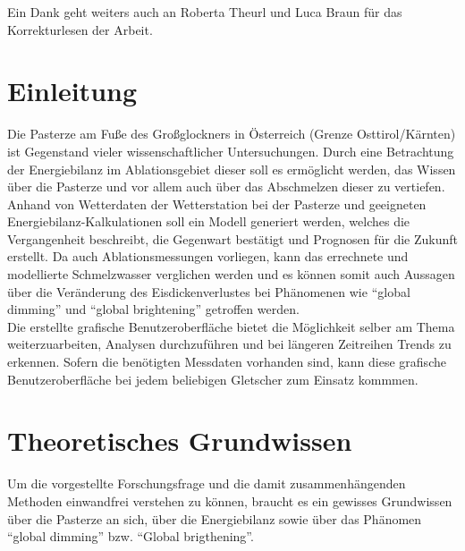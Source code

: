 \documentclass[11pt,a4paper]{article}
\begin{document}
Ein Dank geht weiters auch an Roberta Theurl und Luca Braun für das Korrekturlesen der Arbeit. 


\pagebreak

\tableofcontents
\vspace{1cm}

\pagebreak
\listoffigures
\vspace{1cm}

\pagebreak
\listoftables
\vspace{1cm}


\pagebreak
{}  
\setcounter{page}{1}

\section{Einleitung}
Die Pasterze am Fuße des Großglockners in Österreich (Grenze Osttirol/Kärnten) ist Gegenstand vieler wissenschaftlicher Untersuchungen. Durch eine Betrachtung der Energiebilanz im Ablationsgebiet dieser soll es ermöglicht werden, das Wissen über die Pasterze und vor allem auch über das Abschmelzen dieser zu vertiefen. Anhand von Wetterdaten der Wetterstation bei der Pasterze und geeigneten Energiebilanz-Kalkulationen soll ein Modell generiert werden, welches die Vergangenheit beschreibt, die Gegenwart bestätigt und Prognosen für die Zukunft erstellt. Da auch Ablationsmessungen vorliegen, kann das errechnete und modellierte Schmelzwasser verglichen werden und es können somit auch Aussagen über die Veränderung des Eisdickenverlustes bei Phänomenen wie ``global dimming'' und ``global brightening'' getroffen werden. \\
Die erstellte grafische Benutzeroberfläche bietet die Möglichkeit selber am Thema weiterzuarbeiten, Analysen durchzuführen und bei längeren Zeitreihen Trends zu erkennen. Sofern die benötigten Messdaten vorhanden sind, kann diese grafische Benutzeroberfläche bei jedem beliebigen Gletscher zum Einsatz kommmen.


\section{Theoretisches Grundwissen}
Um die vorgestellte Forschungsfrage und die damit zusammenhängenden Methoden einwandfrei verstehen zu können, braucht es ein gewisses Grundwissen über die Pasterze an sich, über die Energiebilanz sowie über das Phänomen ``global dimming'' bzw. ``Global brigthening''.
\end{document}
